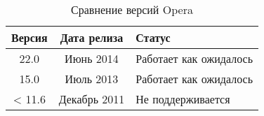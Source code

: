 \begin{table}[h!]
  \caption{\label{tab:brows:opera}Сравнение версий Opera}
  \begin{center}
    \begin{tabular}{|c|c|l|}
      \hline
      Версия & Дата релиза & Статус \\
      \hline
      22.0 & Июнь 2014 & Работает как ожидалось \\
      15.0 & Июль 2013 & Работает как ожидалось \\
      < 11.6 & Декабрь 2011 & Не поддерживается \\
      \hline
    \end{tabular}
  \end{center}
\end{table}

